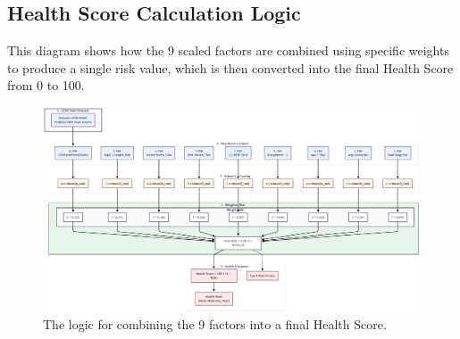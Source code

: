 \documentclass[a4paper,11pt]{article}
\begin{document}
\subsection{Health Score Calculation Logic}
This diagram shows how the 9 scaled factors are combined using specific weights to produce a single risk value, which is then converted into the final Health Score from 0 to 100.
\begin{figure}[h!]
    \centering
    \includegraphics[width=\textwidth, height = \textwidth, keepaspectratio]{flow working.png}
    \caption{The logic for combining the 9 factors into a final Health Score.}
\end{figure}
\end{document}
